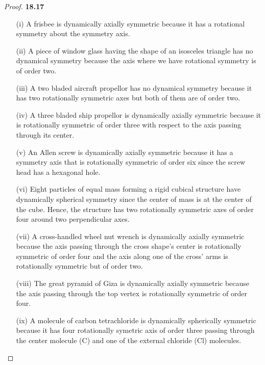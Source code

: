 \documentclass[11pt]{article}
\theoremstyle{definition}
\begin{document}
\begin{proof}{\textbf{18.17}}
\begin{itemize}
    \item [(i)] A frisbee is dynamically axially symmetric because it has a
    rotational symmetry about the symmetry axis.
    \item [(ii)] A piece of window glass having the shape of an isosceles
    triangle has no dynamical symmetry because the axis where we have
    rotational symmetry is of order two.
    \item [(iii)] A two bladed aircraft propellor has no dynamical symmetry
    because it has two rotationally symmetric axes but both of them are of
    order two.
    \item [(iv)] A three bladed ship propellor is dynamically axially
    symmetric because it is rotationally symmetric of order three with respect
    to the axis passing through its center.
    \item [(v)] An Allen screw is dynamically axially symmetric because it
    has a symmetry axis that is rotationally symmetric of order six since
    the screw head has a hexagonal hole.
    \item [(vi)] Eight particles of equal mass forming a rigid cubical
    structure have dynamically spherical symmetry since the center of mass
    is at the center of the cube. Hence, the structure has two rotationally
    symmetric axes of order four around two perpendicular axes.
    \item [(vii)] A cross-handled wheel nut wrench is dynamically axially
    symmetric because the axis passing through the cross shape's center is
    rotationally symmetric of order four and the axis along one of the
    cross' arms is rotationally symmetric but of order two.
    \item [(viii)] The great pyramid of Giza is dynamically axially symmetric
    because the axis passing through the top vertex is rotationally symmetric
    of order four.
    \item [(ix)] A molecule of carbon tetrachloride is dynamically spherically
    symmetric because it has four rotationally symetric axis of order three
    passing through the center molecule (C) and one of the external chloride
    (Cl) molecules. 
\end{itemize}
\end{proof}
\end{document}
